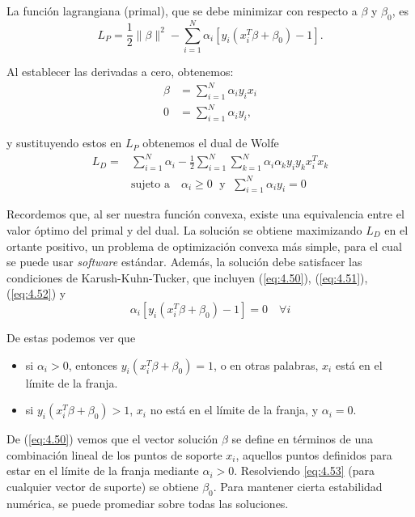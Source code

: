 \noindent La función lagrangiana (primal), que se debe minimizar con respecto a $\beta$ y $\beta_0$, es
\begin{equation}
L_P = \frac{1}{2} \|\beta\|^2 - \sum_{i=1}^N \alpha_i [y_i (x_i^T \beta + \beta_0) - 1].
\end{equation}

\noindent Al establecer las derivadas a cero, obtenemos:
\begin{align}
\beta &= \sum_{i=1}^N \alpha_i y_i x_i \label{eq:4.50}\\
0 &= \sum_{i=1}^N \alpha_i y_i, \label{eq:4.51}
\end{align}

\noindent y sustituyendo estos en $L_P$ obtenemos el dual de Wolfe
\begin{align}
L_D =& \sum_{i=1}^N \alpha_i - \frac{1}{2} \sum_{i=1}^N \sum_{k=1}^N \alpha_i \alpha_k y_i y_k x_i^T x_k \\
& \text{sujeto a} \quad \alpha_i \geq 0 \; \text{ y } \; \sum_{i=1}^N \alpha_i y_i = 0 \label{eq:4.52}
\end{align}

Recordemos que, al ser nuestra función convexa, existe una equivalencia entre el valor óptimo del primal y del dual. La solución se obtiene maximizando $L_D$ en el ortante positivo, un problema de optimización convexa más simple, para el cual se puede usar \textit{software} estándar. Además, la solución debe satisfacer las condiciones de Karush-Kuhn-Tucker, que incluyen (\ref{eq:4.50}), (\ref{eq:4.51}), (\ref{eq:4.52}) y
\begin{equation}
\alpha_i [y_i (x_i^T \beta + \beta_0) - 1] = 0 \quad \forall i \label{eq:4.53}
\end{equation}

\noindent De estas podemos ver que
\begin{itemize}
    \item si $\alpha_i > 0$, entonces $y_i (x_i^T \beta + \beta_0) = 1$, o en otras palabras, $x_i$ está en el límite de la franja.
    \item si $y_i (x_i^T \beta + \beta_0) > 1$, $x_i$ no está en el límite de la franja, y $\alpha_i = 0$.
\end{itemize}

De (\ref{eq:4.50}) vemos que el vector solución $\beta$ se define en términos de una combinación lineal de los puntos de soporte $x_i$, aquellos puntos definidos para estar en el límite de la franja mediante $\alpha_i > 0$. Resolviendo \ref{eq:4.53} (para cualquier vector de suporte) se obtiene $\beta_0$. Para mantener cierta estabilidad numérica, se puede promediar sobre todas las soluciones.















